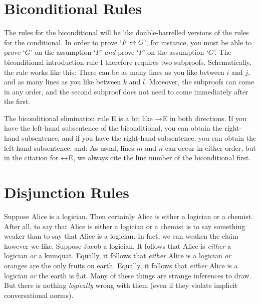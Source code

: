 \section{Biconditional Rules}
The rules for the biconditional will be like double-barrelled versions of the rules for the conditional.  In order to prove `$F \leftrightarrow G$', for instance, you must be able to prove `$G$' on the assumption `$F$' \emph{and} prove `$F$' on the assumption `$G$'. The biconditional introduction rule {\eiff}I therefore requires two subproofs. Schematically, the rule works like this:
There can be as many lines as you like between $i$ and $j$, and as many lines as you like between $k$ and $l$. Moreover, the subproofs can come in any order, and the second subproof does not need to come immediately after the first.

The biconditional elimination rule {\eiff}E is a bit like $\rightarrow$E in both directions. If you have the left-hand subsentence of the biconditional, you can obtain the right-hand subsentence, and if you have the right-hand subsentence, you can obtain the left-hand subsentence:
and:
As usual, lines $m$ and $n$ can occur in either order, but in the citation for $\leftrightarrow$E, we always cite the line number of the biconditional first.

\section{Disjunction Rules}
Suppose Alice is a logician. Then certainly Alice is either a logician or a chemist. After all, to say that Alice is either a logician or a chemist is to say something weaker than to say that Alice is a logician. In fact, we can weaken the claim however we like. Suppose Jacob a logician. It follows that Alice is \emph{either} a logician \emph{or} a kumquat. Equally, it follows that \emph{either} Alice is a logician \emph{or} oranges are the only fruits on earth.  Equally, it follows that \emph{either} Alice is a logician \emph{or} the earth is flat. Many of these things are strange inferences to draw. But there is nothing \emph{logically} wrong with them (even if they violate implicit conversational norms).

